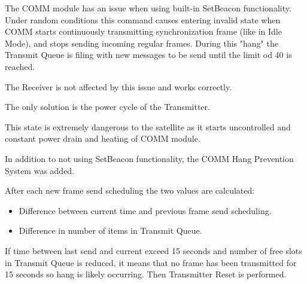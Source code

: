
The COMM module has an issue when using built-in SetBeacon functionality.
Under random conditions this command causes entering invalid state when COMM starts continuously transmitting synchronization frame (like in Idle Mode), and stops sending incoming regular frames.
During this "hang" the Transmit Queue is filing with new messages to be send until the limit od 40 is reached.

The Receiver is not affected by this issue and works correctly.

The only solution is the power cycle of the Transmitter.

This state is extremely dangerous to the satellite as it starts uncontrolled and constant power drain and heating of COMM module. 

In addition to not using SetBeacon functionality, the COMM Hang Prevention System was added.

After each new frame send scheduling the two values are calculated:
\begin{itemize}
\item Difference between current time and previous frame send scheduling.
\item Difference in number of items in Transmit Queue. 
\end{itemize}

If time between last send and current exceed 15 seconds and number of free slots in Transmit Queue is reduced, it means that no frame has been transmitted for 15 seconds so hang is likely occurring.
Then Transmitter Reset is performed.
